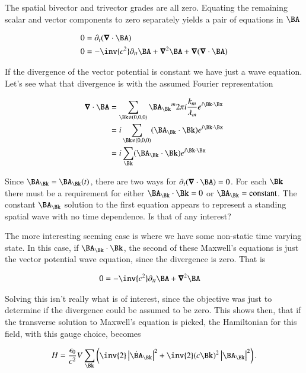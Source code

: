 The spatial bivector and trivector grades are all zero.  Equating the remaining scalar and vector components to zero separately yields a pair of equations in $\BA$

\begin{subequations}
\label{eqn:fourierMaxVac:45}
\begin{align}
0 &= \partial_t (\spacegrad \cdot \BA) \\
0 &= -\inv{c^2} \partial_{tt} \BA + \spacegrad^2 \BA + \spacegrad (\spacegrad \cdot \BA) 
\end{align}
\end{subequations}

If the divergence of the vector potential is constant we have just a wave equation.  Let's see what that divergence is with the assumed Fourier representation

\begin{align*}
\spacegrad \cdot \BA 
&=
\sum_{\Bk \ne (0,0,0)} {\BA_\Bk}^m 2 \pi i \frac{k_m}{\lambda_m} e^{i \Bk \cdot \Bx} \\
&=
i \sum_{\Bk \ne (0,0,0)} (\BA_\Bk \cdot \Bk) e^{i \Bk \cdot \Bx} \\
&=
i \sum_\Bk (\BA_\Bk \cdot \Bk) e^{i \Bk \cdot \Bx} 
\end{align*}

Since $\BA_\Bk = \BA_\Bk(t)$, there are two ways for $\partial_t (\spacegrad \cdot \BA) = 0$.  For each $\Bk$ there must be a requirement for either $\BA_\Bk \cdot \Bk = 0$ or $\BA_\Bk = \text{constant}$.  The constant $\BA_\Bk$ solution to the first equation appears to represent a standing spatial wave with no time dependence.  Is that of any interest?

The more interesting seeming case is where we have some non-static time varying state.  In this case, if $\BA_\Bk \cdot \Bk$, the second of these Maxwell's equations is just the vector potential wave equation, since the divergence is zero.  That is

\begin{align}\label{eqn:fourierMaxVac:50}
0 &= -\inv{c^2} \partial_{tt} \BA + \spacegrad^2 \BA 
\end{align}

Solving this isn't really what is of interest, since the objective was just to determine if the divergence could be assumed to be zero.  This shows then, that if the transverse solution to Maxwell's equation is picked, the Hamiltonian for this field, with this gauge choice, becomes

\begin{align}
\label{eqn:fourierMaxVac:17c}
H = 
\frac{\epsilon_0}{c^2} V \sum_\Bk
\left(
\inv{2} \Abs{\dot{\BA}_\Bk}^2
+
\inv{2} 
(c \Bk)^2 \Abs{\BA_\Bk}^2 
\right).
\end{align}

